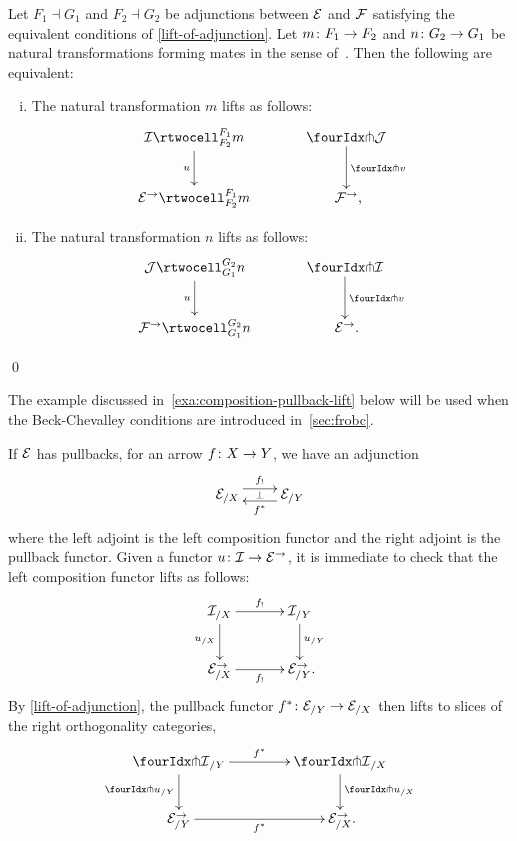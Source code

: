 \documentclass[reqno,10pt,a4paper,oneside,draft]{amsart}
\begin{document}
\begin{lemma} \label{lift-of-mates}
Let $F_1 \dashv G_1$ and $F_2 \dashv G_2$ be adjunctions between $\cal{E}$ and $\cal{F}$ satisfying the equivalent conditions of \cref{lift-of-adjunction}.
Let $m \co F_1 \to F_2$ and $n \co G_2 \to G_1$ be natural transformations forming mates in the sense of~\cite{kelly-street}.
Then the following are equivalent:
\begin{enumerate}[(i)]
\item
The natural transformation $m$ lifts as follows:
\[
\xymatrix@C=1.2cm{
  \cal{I}
  \rtwocell_{F_2}^{F_1}{m}
  \ar[d]_{u}
&
  \liftl{\cal{J}}
  \ar[d]^{\liftl{v}}
\\
  \catE^\to
  \rtwocell_{F_2}^{F_1}{m}
&
  \cal{F}^\to
\rlap{,}}
\]
\item
The natural transformation $n$ lifts as follows:
\[
\xymatrix@C=1.2cm{
  \cal{J}
  \rtwocell_{G_1}^{G_2}{n}
  \ar[d]_{u}
&
  \liftr{\cal{I}}
  \ar[d]^{\liftl{v}}
\\
  \cal{F}^\to
  \rtwocell_{G_1}^{G_2}{n}
&
  \cal{E}^\to
\rlap{.}}
\]
\end{enumerate}
\qed
\end{lemma}

The example discussed in~\cref{exa:composition-pullback-lift} below will be used when the Beck-Chevalley conditions are introduced in~\cref{sec:frobc}.

\begin{remark} \label{exa:composition-pullback-lift}
If $\cal{E}$ has pullbacks, for an arrow $f \co X \to Y$, we have an adjunction
\[
\xymatrix{
  \catE_{/X}
  \ar@<1ex>[r]^{f_!}
  \ar@{}[r]|{\bot}
&
  \catE_{/Y}
  \ar@<1ex>[l]^{f^*}
}
\]
where the left adjoint is the left composition functor and the right adjoint is the pullback functor.
Given a functor $u \co \cal{I} \to \catE^\to$, it is immediate to check that the left composition functor lifts as follows:
\[
\xymatrix@C+1em{
  \cal{I}_{/X}
  \ar[r]^-{f_!}
  \ar[d]_{u_{/X}}
&
  \cal{I}_{/Y}
  \ar[d]^{u_{/Y}}
\\
  \calE_{/X}^\to
  \ar[r]_-{f_!}
&
  \calE_{/Y}^\to
\rlap{.}}
\]
By \cref{lift-of-adjunction}, the pullback functor $f^* \co \catE_{/Y} \to \catE_{/X}$ then lifts to slices of the right orthogonality categories,
\[
\xymatrix@C=1.5cm{
  \liftr{\cal{I}}_{/Y}
  \ar[d]_{{\liftr{u}}_{/Y}}
  \ar[r]^{f^*}
&
  \liftr{\cal{I}}_{/X}
  \ar[d]^{{\liftr{u}}_{/X}}
\\
  {\catE}_{/Y}^\to
  \ar[r]_{f^*}
&
  \catE_{/X}^\to
\rlap{.}}
\]
\end{remark}
\end{document}
